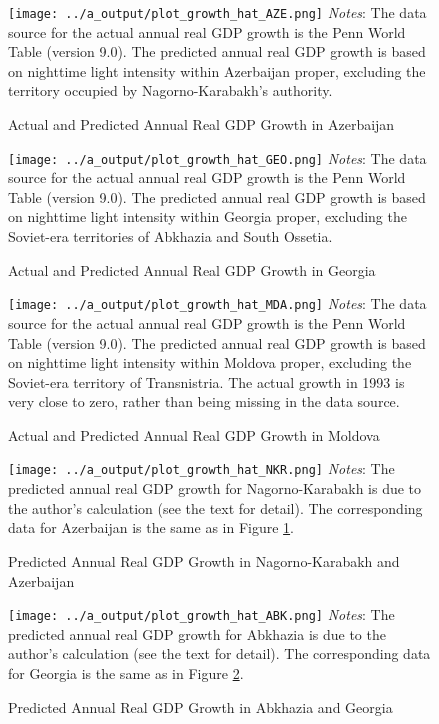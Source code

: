 \documentclass[12pt,a4paper]{article}%
\begin{document}
\begin{figure}[ptb]
\caption{Actual and Predicted Annual Real GDP Growth in Azerbaijan}%
\label{aze}%
\texttt{[image: ../a\_output/plot\_growth\_hat\_AZE.png]}
{\scriptsize \textit{Notes}: 
	The data source for the actual annual real GDP growth is the Penn World Table (version 9.0). 
	The predicted annual real GDP growth is based on nighttime light intensity within Azerbaijan proper, excluding the territory occupied by Nagorno-Karabakh's authority. 
}
\end{figure}

\begin{figure}[ptb]
\caption{Actual and Predicted Annual Real GDP Growth in Georgia}%
\label{geo}%
\texttt{[image: ../a\_output/plot\_growth\_hat\_GEO.png]}
{\scriptsize \textit{Notes}: 
	The data source for the actual annual real GDP growth is the Penn World Table (version 9.0). 
	The predicted annual real GDP growth is based on nighttime light intensity within Georgia proper, excluding the Soviet-era territories of Abkhazia and South Ossetia. 
}
\end{figure}

\begin{figure}[ptb]
\caption{Actual and Predicted Annual Real GDP Growth in Moldova}%
\label{mda}%
\texttt{[image: ../a\_output/plot\_growth\_hat\_MDA.png]}
{\scriptsize \textit{Notes}: 
	The data source for the actual annual real GDP growth is the Penn World Table (version 9.0). 
	The predicted annual real GDP growth is based on nighttime light intensity within Moldova proper, excluding the Soviet-era territory of Transnistria. 
	The actual growth in 1993 is very close to zero, rather than being missing in the data source.
}
\end{figure}

\begin{figure}[ptb]
\caption{Predicted Annual Real GDP Growth in Nagorno-Karabakh and Azerbaijan}%
\label{nkr}%
\texttt{[image: ../a\_output/plot\_growth\_hat\_NKR.png]}
{\scriptsize \textit{Notes}: 
	The predicted annual real GDP growth for Nagorno-Karabakh is due to the author's calculation (see the text for detail).
	The corresponding data for Azerbaijan is the same as in Figure \ref{aze}.
}
\end{figure}

\begin{figure}[ptb]
\caption{Predicted Annual Real GDP Growth in Abkhazia and Georgia}%
\label{abk}%
\texttt{[image: ../a\_output/plot\_growth\_hat\_ABK.png]}
{\scriptsize \textit{Notes}: 
	The predicted annual real GDP growth for Abkhazia is due to the author's calculation (see the text for detail).
	The corresponding data for Georgia is the same as in Figure \ref{geo}.
}
\end{figure}
\end{document}
